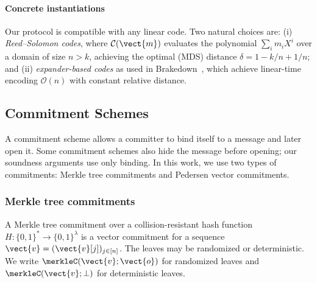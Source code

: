 \paragraph{Concrete instantiations}
Our protocol is compatible with any linear code.
Two natural choices are: (i) \emph{Reed--Solomon codes}, where $\mathcal{C}(\vect{m})$ evaluates the polynomial $\sum_i m_i X^i$ over a domain of size $n > k$, achieving the optimal (MDS) distance $\delta = 1 - k/n + 1/n$; and (ii) \emph{expander-based codes} as used in Brakedown~\cite{golovnev2023brakedown}, which achieve linear-time encoding $\mathcal{O}(n)$ with constant relative distance.


\subsection{Commitment Schemes}
\label{sec:prelim-commitments}
A commitment scheme allows a committer to bind itself to a message and later
open it. Some commitment schemes also hide the message before opening; our
soundness arguments use only binding. In this work, we use two types of
commitments: Merkle tree commitments and Pedersen vector commitments.

\subsubsection{Merkle tree commitments}

A Merkle tree commitment over a collision-resistant hash function $H: \{0,1\}^* \to \{0,1\}^\lambda$ is a vector commitment for a sequence $\vect{v}=(\vect{v}[j])_{j\in[n]}$.
The leaves may be randomized or deterministic. We write
\(\merkleC(\vect{v};\vect{o})\) for randomized leaves and
\(\merkleC(\vect{v};\bot)\) for deterministic leaves.


